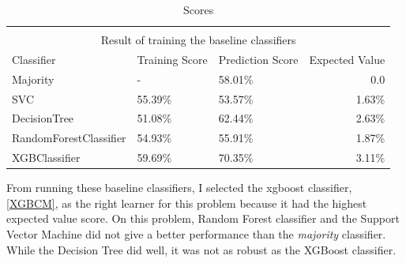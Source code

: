 \setlength{\extrarowheight}{1.5pt}
\begin{table}[!htbp]
\caption{Scores} %
\centering %
\begin{tabular}{|l|l|l|r|} %
\hline %


\multicolumn{4}{|c|}{}\\
\multicolumn{4}{|c|}{Result of training the baseline classifiers}\\[5pt]
\hline
Classifier & Training Score & Prediction Score & Expected Value\\[0.5ex]
\hline %

Majority & - & 58.01\% & 0.0 \\
SVC     & 55.39\% & 53.57\% & 1.63\% \\
DecisionTree       & 51.08\% & 62.44\% & 2.63\%\\
RandomForestClassifier   & 54.93\% & 55.91\% & 1.87\%\\
XGBClassifier            & 59.69\% & 70.35\% & 3.11\%\\

\hline%
\end{tabular}
\label{tableBenchMarkScores}{}
\end{table}

From running these baseline classifiers, I selected the xgboost classifier, \ref{XGBCM}, as the right learner for this problem because it had the highest expected value score. On this problem, Random Forest classifier and the Support Vector Machine did not give a better performance than the \textit{majority} classifier. While the Decision Tree did well, it was not as robust as the XGBoost classifier.

